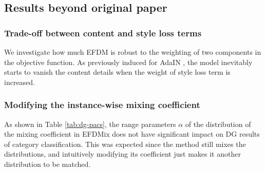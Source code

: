 \begin{table}[!t]
\centering
\caption{DG results on person re-ID task. (R) refers to our reproduced results.}
\label{tab:dg-reid}
\end{table}

\subsection{Results beyond original paper}
 
\subsubsection{Trade-off between content and style loss terms}
We investigate how much EFDM is robust to the weighting of two components in the objective function. As previously induced for AdaIN \cite{huang2017arbitrary}, the model inevitably starts to vanish the content details when the weight of style loss term is increased.

\subsubsection{Modifying the instance-wise mixing coefficient}
As shown in Table \ref{tab:dg-pacs}, the range parameters $\alpha$ of the distribution of the mixing coefficient in EFDMix does not have significant impact on DG results of category classification. This was expected since the method still mixes the distributions, and intuitively modifying its coefficient just makes it another distribution to be matched. 

